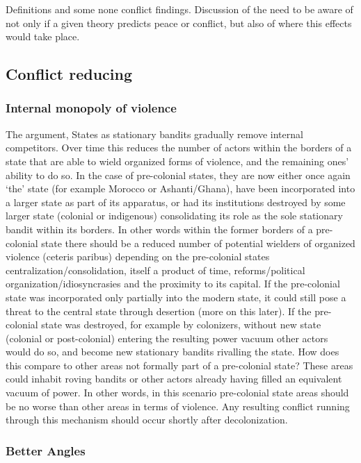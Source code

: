 \documentclass[12pt]{article}
\begin{document}
Definitions and some none conflict findings. Discussion of the need to be aware
of not only if a given theory predicts peace or conflict, but also of where this
effects would take place.

\subsection{Conflict reducing}

\subsubsection{Internal monopoly of violence}

The \citet{Tilly1990} argument, 
States as stationary bandits gradually remove internal
competitors. Over time this reduces the number of actors within the borders of a
state that are able to wield organized forms of violence, and the remaining
ones' ability to do so. In the case of pre-colonial states, they are now either
once again `the' state (for example Morocco or Ashanti/Ghana), have been
incorporated into a larger state as part of its apparatus, or had its
institutions destroyed by some larger state (colonial or indigenous)
consolidating its role as the sole stationary bandit within its borders. In
other words within the former borders of a pre-colonial state there should be a
reduced number of potential wielders of organized violence (ceteris paribus)
depending on the pre-colonial states centralization/consolidation, itself a
product of time, reforms/political organization/idiosyncrasies and the proximity
to its capital. If the pre-colonial state was incorporated only partially into
the modern state, it could still pose a threat to the central state through
desertion (more on this later). If the pre-colonial state was destroyed, for
example by colonizers, without new state (colonial or post-colonial) entering
the resulting power vacuum other actors would do so, and become new stationary
bandits rivalling the state. How does this compare to other areas not formally
part of a pre-colonial state? These areas could inhabit roving bandits
\citep{Scott2009} or other actors already having filled an equivalent vacuum of
power. In other words, in this scenario pre-colonial state areas should be no
worse than other areas in terms of violence. Any resulting conflict running
through this mechanism should occur shortly after decolonization.

\subsubsection{Better Angles}
\end{document}
